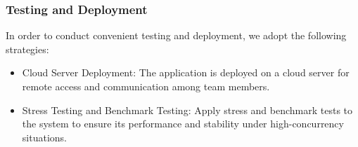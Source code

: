 \subsubsection{Testing and Deployment} 

In order to conduct convenient testing and deployment, we adopt the following strategies:

\begin{itemize}
    \item Cloud Server Deployment: The application is deployed on a cloud server for remote access and communication among team members.
    \item Stress Testing and Benchmark Testing: Apply stress and benchmark tests to the system to ensure its performance and stability under high-concurrency situations.
  \end{itemize}
